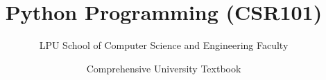 \documentclass[a4paper,11pt,oneside,openany]{book}
\title{Python Programming (CSR101)}
\author{LPU School of Computer Science and Engineering Faculty}
\date{Comprehensive University Textbook}
\begin{document}
\frontmatter

\makebookcover
\copyrightpage
\disclaimerpage

\tableofcontents
\newpage

\mainmatter







\end{document}
